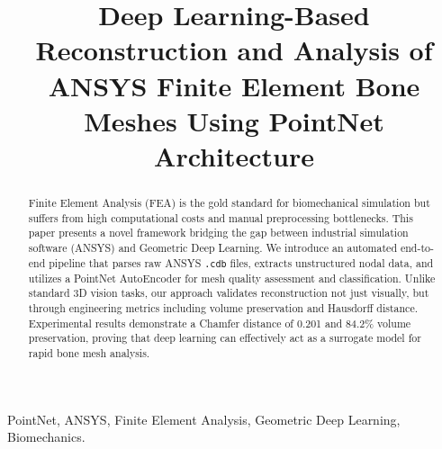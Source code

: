 \documentclass[conference]{IEEEtran}
\begin{document}
\title{Deep Learning-Based Reconstruction and Analysis of ANSYS Finite Element Bone Meshes Using PointNet Architecture}


\maketitle

\begin{abstract}
Finite Element Analysis (FEA) is the gold standard for biomechanical simulation but suffers from high computational costs and manual preprocessing bottlenecks. This paper presents a novel framework bridging the gap between industrial simulation software (ANSYS) and Geometric Deep Learning. We introduce an automated end-to-end pipeline that parses raw ANSYS \texttt{.cdb} files, extracts unstructured nodal data, and utilizes a PointNet AutoEncoder for mesh quality assessment and classification. Unlike standard 3D vision tasks, our approach validates reconstruction not just visually, but through engineering metrics including volume preservation and Hausdorff distance. Experimental results demonstrate a Chamfer distance of 0.201 and 84.2\% volume preservation, proving that deep learning can effectively act as a surrogate model for rapid bone mesh analysis.
\end{abstract}

\begin{IEEEkeywords}
PointNet, ANSYS, Finite Element Analysis, Geometric Deep Learning, Biomechanics.
\end{IEEEkeywords}
\end{document}
